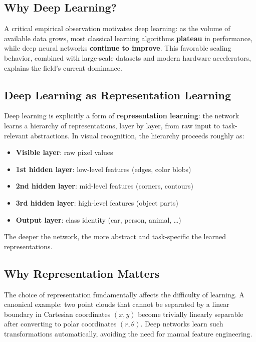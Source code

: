 \documentclass[11pt,a4paper]{article}
\theoremstyle{definition}
\theoremstyle{plain}
\theoremstyle{remark}
\begin{document}
\subsection{Why Deep Learning?}

A critical empirical observation motivates deep learning: as the volume of available data grows, most classical learning algorithms \textbf{plateau} in performance, while deep neural networks \textbf{continue to improve}. This favorable scaling behavior, combined with large-scale datasets and modern hardware accelerators, explains the field's current dominance.

\subsection{Deep Learning as Representation Learning}

Deep learning is explicitly a form of \textbf{representation learning}: the network learns a hierarchy of representations, layer by layer, from raw input to task-relevant abstractions. In visual recognition, the hierarchy proceeds roughly as:

\begin{itemize}
    \item \textbf{Visible layer}: raw pixel values
    \item \textbf{1st hidden layer}: low-level features (edges, color blobs)
    \item \textbf{2nd hidden layer}: mid-level features (corners, contours)
    \item \textbf{3rd hidden layer}: high-level features (object parts)
    \item \textbf{Output layer}: class identity (car, person, animal, \ldots)
\end{itemize}

The deeper the network, the more abstract and task-specific the learned representations.

\subsection{Why Representation Matters}

The choice of representation fundamentally affects the difficulty of learning. A canonical example: two point clouds that cannot be separated by a linear boundary in Cartesian coordinates $(x, y)$ become trivially linearly separable after converting to polar coordinates $(r, \theta)$. Deep networks learn such transformations automatically, avoiding the need for manual feature engineering.
\end{document}

